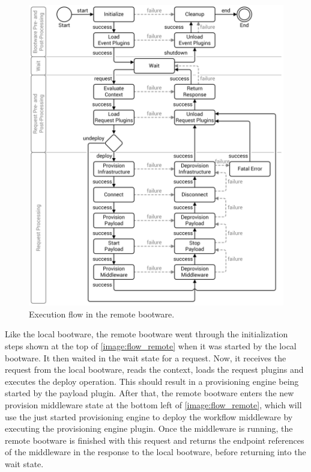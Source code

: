 \begin{figure}[!htbp]
	\centering
	\includegraphics[resolution=600]{design/assets/flow_remote}
	\caption{Execution flow in the remote bootware.}
	\label{image:flow_remote}
\end{figure}

Like the local bootware, the remote bootware went through the initialization steps shown at the top of \autoref{image:flow_remote} when it was started by the local bootware.
It then waited in the wait state for a request.
Now, it receives the request from the local bootware, reads the context, loads the request plugins and executes the deploy operation.
This should result in a provisioning engine being started by the payload plugin.
After that, the remote bootware enters the new provision middleware state at the bottom left of \autoref{image:flow_remote}, which will use the just started provisioning engine to deploy the workflow middleware by executing the provisioning engine plugin.
Once the middleware is running, the remote bootware is finished with this request and returns the endpoint references of the middleware in the response to the local bootware, before returning into the wait state.

